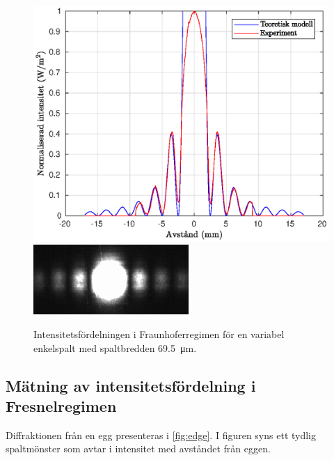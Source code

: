 \documentclass[a4paper]{article}
\begin{document}
\begin{figure}[h!]
	\centering
	\includegraphics[width=0.75\linewidth]{Data/Figurer/variabelEnkelspalt2.eps}
	\includegraphics[width=0.5\linewidth]{Data/Figurer/variabelEnkelspalt2.png}
	\caption{Intensitetsfördelningen i Fraunhoferregimen för en variabel enkelspalt med spaltbredden \SI{69.5}{\micro\m}.}
	\label{fig:variabelEnkelspalt3}
\end{figure}

\FloatBarrier

\subsection{Mätning av intensitetsfördelning i Fresnelregimen}

Diffraktionen från en egg presenteras i \autoref{fig:edge}. I figuren syns ett tydlig spaltmönster som avtar i intensitet med avståndet från eggen.

\FloatBarrier
\end{document}
